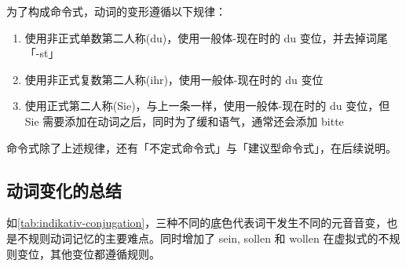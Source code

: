为了构成命令式，动词的变形遵循以下规律：
\begin{enumerate}[leftmargin=3.5em, topsep=0pt, itemsep=0pt, parsep=0pt]
    \item 使用非正式单数第二人称(du)，使用一般体-现在时的 du 变位，并去掉词尾「-st」
    \item 使用非正式复数第二人称(ihr)，使用一般体-现在时的 du 变位
    \item 使用正式第二人称(Sie)，与上一条一样，使用一般体-现在时的 du 变位，但 Sie 需要添加在动词之后，同时为了缓和语气，通常还会添加 bitte
\end{enumerate}
命令式除了上述规律，还有「不定式命令式」与「建议型命令式」，在后续说明。


\subsection{动词变化的总结}

如\cref{tab:indikativ-conjugation}，三种不同的底色代表词干发生不同的元音音变，也是不规则动词记忆的主要难点。同时增加了 sein, sollen 和 wollen 在虚拟式的不规则变位，其他变位都遵循规则。


